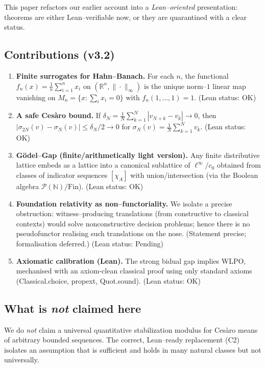 \documentclass[11pt]{article}
\theoremstyle{definition}
\newcommand{\N}{\mathbb{N}}
\newcommand{\R}{\mathbb{R}}
\newcommand{\linf}{\ell^\infty}
\newcommand{\cnull}{c_0}
\newcommand{\leanok}{\textsf{\small (Lean status: OK)}}
\newcommand{\leanpending}{\textsf{\small (Lean status: Pending)}}
\begin{document}
This paper refactors our earlier account into a \emph{Lean--oriented} presentation:
theorems are either Lean--verifiable now, or they are quarantined with a clear status.

\subsection{Contributions (v3.2)}
\begin{enumerate}[label=(C\arabic*)]
  \item \textbf{Finite surrogates for Hahn--Banach.} For each $n$, the functional
  $f_n(x)=\frac1n\sum_{i=1}^n x_i$ on $(\R^n,\|\cdot\|_\infty)$ is the unique norm--$1$
  linear map vanishing on $M_n=\{x:\sum_i x_i=0\}$ with $f_n(1,\dots,1)=1$. \leanok

  \item \textbf{A safe Cesàro bound.} If
  $\delta_N=\frac1N\sum_{k=1}^{N}|v_{N+k}-v_k|\to0$, then
  $|\sigma_{2N}(v)-\sigma_N(v)|\le \delta_N/2\to 0$
  for $\sigma_N(v)=\frac1N\sum_{k=1}^N v_k$. \leanok

  \item \textbf{Gödel--Gap (finite/arithmetically light version).}
  Any finite distributive lattice embeds as a lattice into a canonical sublattice of
  $\linf/\cnull$ obtained from classes of indicator sequences $[\chi_A]$ with union/intersection
  (via the Boolean algebra $\mathcal P(\N)/\mathrm{Fin}$). \leanok

  \item \textbf{Foundation relativity as non--functoriality.}
  We isolate a precise obstruction: witness--producing translations (from constructive
  to classical contexts) would solve nonconstructive decision problems; hence there is
  no pseudofunctor realising such translations on the nose.
  (Statement precise; formalisation deferred.) \leanpending

  \item \textbf{Axiomatic calibration (Lean).}
  The strong bidual gap implies WLPO, mechanised with an axiom-clean classical proof using
  only standard axioms (Classical.choice, propext, Quot.sound). \leanok
\end{enumerate}

\subsection{What is \emph{not} claimed here}
We do \emph{not} claim a universal quantitative stabilization modulus for Cesàro means
of arbitrary bounded sequences. The correct, Lean--ready replacement (C2) isolates an
assumption that is sufficient and holds in many natural classes but not universally.
\end{document}
